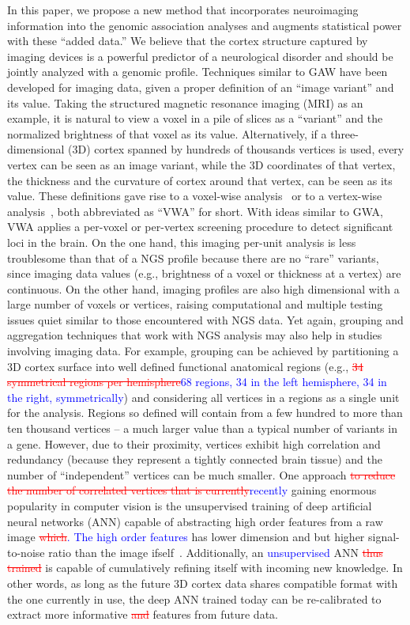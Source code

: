 \documentclass[11pt]{article}
\newcommand{\xadd}[1]{\textcolor{blue}{#1}}
\newcommand{\xdel}[1]{\textcolor{red}{\sout{#1}}}
\newcommand{\xrpl}[2]{\xdel{#1}\xadd{#2}}
\begin{document}
In this paper, we propose a new method that incorporates neuroimaging information into the genomic association analyses and augments statistical power with these ``added data.'' We believe that the cortex structure captured by imaging devices is a powerful predictor of a neurological disorder and should be jointly analyzed with a genomic profile. Techniques similar to GAW have been developed for imaging data, given a proper definition of an ``image variant'' and its value. Taking the structured magnetic resonance imaging (MRI) as an example, it is natural to view a voxel in a pile of slices as a ``variant'' and the normalized brightness of that voxel as its value. Alternatively, if a three-dimensional (3D) cortex spanned by hundreds of thousands vertices is used, every vertex can be seen as an image variant, while the 3D coordinates of that vertex, the thickness and the curvature of cortex around that vertex, can be seen as its value. These definitions gave rise to a voxel-wise analysis~\citep{VWA1, VWA2, VWA3, VWA4} or to a vertex-wise analysis~\citep{FS:Anl1, FS:Anl2}, both abbreviated as ``VWA'' for short. With ideas similar to GWA, VWA applies a per-voxel or per-vertex screening procedure to detect significant loci in the brain. On the one hand, this imaging per-unit analysis is less troublesome than that of a NGS profile because there are no ``rare'' variants, since imaging data values (e.g., brightness of a voxel or thickness at a vertex) are continuous. On the other hand, imaging profiles are also high dimensional with a large number of voxels or vertices, raising computational and multiple testing issues quiet similar to those encountered with NGS data. Yet again, grouping and aggregation techniques that work with NGS analysis may also help in studies involving imaging data. For example, grouping can be achieved by partitioning a 3D cortex surface into well defined functional anatomical regions (e.g., \xrpl{34 symmetrical regions per hemisphere}{68 regions, 34 in the left hemisphere, 34 in the right, symmetrically}) and considering all vertices in a regions as a single unit for the analysis. Regions so defined will contain from a few hundred to more than ten thousand vertices -- a much larger value than a typical number of variants in a gene. However, due to their proximity, vertices exhibit high correlation and redundancy (because they represent a tightly connected brain tissue) and the number of ``independent'' vertices can be much smaller. One approach \xrpl{to reduce the number of correlated vertices that is currently}{recently} gaining enormous popularity in computer vision is the unsupervised training of deep artificial neural networks (ANN) capable of abstracting high order features from a raw image \xrpl{which}{. The high order features} has lower dimension and but higher signal-to-noise ratio than the image ifself~\citep{DL:Intro1, DL:SDA1, DL:Intro2}. Additionally, an \xadd{unsupervised} ANN \xdel{thus trained} is capable of cumulatively refining itself with incoming new knowledge. In other words, as long as the future 3D cortex data shares compatible format with the one currently in use, the deep ANN trained today can be re-calibrated to extract more informative \xdel{and }features from future data.
\end{document}
